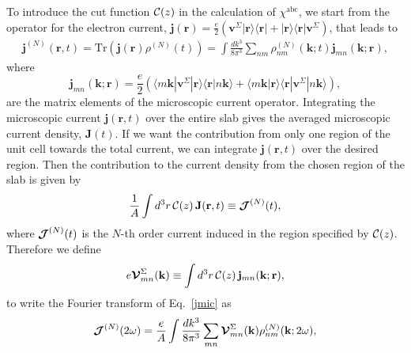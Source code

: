 \documentclass[floatfix,prb,aps,superscriptaddress,showpacs,11pt,preprint,letterpaper]{revtex4}
\begin{document}
To introduce the
cut function ${\mathbf{\cal C}}(z)$ in
the calculation of $\chi^{\mathrm{a}\mathrm{b}\mathrm{c}}$, we start from 
the operator for the electron current,
$\mathbf{j}(\mathbf{r})=\frac{e}{2}\left(\mathbf{v}^\Sigma | \mathbf{r}\rangle\langle\mathbf{r} |
+ | \mathbf{r}\rangle\langle\mathbf{r} | \mathbf{v}^\Sigma\right)$, that leads to
\begin{align}\label{jmic}
\mathbf{j}^{(N)}(\mathbf{r},t)=\mathrm{Tr}(\mathbf{j}(\mathbf{r})\rho^{(N)}(t))
=
\int \frac{dk^3}{8\pi^3}
\sum_{nm}
\rho^{(N)}_{nm}(\mathbf{k};t)\mathbf{j}_{mn}(\mathbf{k};\mathbf{r})
,
\end{align}
where 
\begin{equation}\label{jmic3}
\mathbf{j}_{mn}(\mathbf{k};\mathbf{r})=
\frac{e}{2}
\left(
\langle m\mathbf{k} | \mathbf{v}^\Sigma | \mathbf{r}\rangle \langle\mathbf{r}|n\mathbf{k}\rangle
+
\langle m\mathbf{k}|\mathbf{r}\rangle\langle\mathbf{r} | \mathbf{v}^\Sigma | n\mathbf{k}\rangle
\right),
\end{equation}
are the matrix elements of the microscopic current operator.
Integrating the microscopic current $\mathbf{j}(\mathbf{r},t)$ over
the entire slab gives the averaged microscopic current density, $\mathbf{J}(t)$. 
If we want the contribution from only one region of the unit cell 
towards the total current, we can integrate $\mathbf{j}({\mathbf r},t)$ 
over the desired region. Then the contribution 
to the current density from the
chosen region of the slab is given by
\begin{equation}\label{jsz}
\frac{1}{A}\int d^3r\, {\mathbf{\cal C}}(z)\, 
\mathbf{J} (\mathbf{r},t)
 \equiv \boldsymbol{\mathcal{\cal J}}^{(N)}(t),
\end{equation}
where $\boldsymbol{\mathcal{\cal J}}^{(N)}(t)$ is the $N$-th order current induced in the
region specified by ${\mathbf{\cal C}}(z)$.
Therefore we define
\begin{equation}\label{vcal}
e{\boldsymbol{\mathcal{V}}}^{\Sigma}_{mn}(\mathbf{k})
\equiv
\int d^3r\, {\mathbf{\cal C}}(z)\,\mathbf{j}_{mn}({\mathbf{k}};\mathbf{r}),
\end{equation}
to write the Fourier transform of Eq.~\eqref{jmic} as
\begin{equation}\label{jmac2}
\boldsymbol{\mathcal{\cal J}}^{(N)}(2\omega)=\frac{e}{A}
\int \frac{dk^3}{8\pi^3}
\sum_{mn}
\boldsymbol{\mathcal{\cal V}}^{\Sigma}_{mn}(\mathbf{k}) 
\rho^{(N)}_{nm}(\mathbf{k};2\omega) 
, 
\end{equation}
\end{document}
